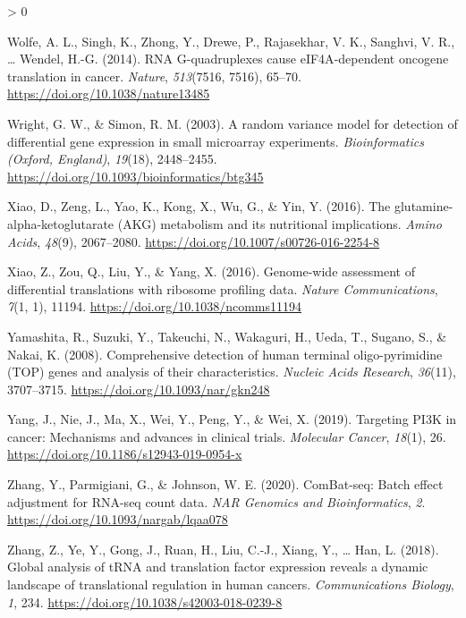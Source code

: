 \documentclass[
  12pt,
  openany]{book}
\newlength{\cslhangindent}
\newenvironment{CSLReferences}[2] %
 {%
  \setlength{\parindent}{0pt}
  \ifodd #1 \everypar{\setlength{\hangindent}{\cslhangindent}}\ignorespaces\fi
  \ifnum #2 > 0
  \setlength{\parskip}{#2\baselineskip}
  \fi
 }%
 {}
\begin{document}
\begin{CSLReferences}{1}{0}
\leavevmode\hypertarget{ref-Wolfe2014}{}%
Wolfe, A. L., Singh, K., Zhong, Y., Drewe, P., Rajasekhar, V. K., Sanghvi, V. R., \ldots{} Wendel, H.-G. (2014). {RNA G}-quadruplexes cause {eIF4A}-dependent oncogene translation in cancer. \emph{Nature}, \emph{513}(7516, 7516), 65--70. \url{https://doi.org/10.1038/nature13485}

\leavevmode\hypertarget{ref-Wright2003}{}%
Wright, G. W., \& Simon, R. M. (2003). A random variance model for detection of differential gene expression in small microarray experiments. \emph{Bioinformatics (Oxford, England)}, \emph{19}(18), 2448--2455. \url{https://doi.org/10.1093/bioinformatics/btg345}

\leavevmode\hypertarget{ref-Xiao2016}{}%
Xiao, D., Zeng, L., Yao, K., Kong, X., Wu, G., \& Yin, Y. (2016). The glutamine-alpha-ketoglutarate ({AKG}) metabolism and its nutritional implications. \emph{Amino Acids}, \emph{48}(9), 2067--2080. \url{https://doi.org/10.1007/s00726-016-2254-8}

\leavevmode\hypertarget{ref-Xiao2016a}{}%
Xiao, Z., Zou, Q., Liu, Y., \& Yang, X. (2016). Genome-wide assessment of differential translations with ribosome profiling data. \emph{Nature Communications}, \emph{7}(1, 1), 11194. \url{https://doi.org/10.1038/ncomms11194}

\leavevmode\hypertarget{ref-Yamashita2008}{}%
Yamashita, R., Suzuki, Y., Takeuchi, N., Wakaguri, H., Ueda, T., Sugano, S., \& Nakai, K. (2008). Comprehensive detection of human terminal oligo-pyrimidine ({TOP}) genes and analysis of their characteristics. \emph{Nucleic Acids Research}, \emph{36}(11), 3707--3715. \url{https://doi.org/10.1093/nar/gkn248}

\leavevmode\hypertarget{ref-Yang2019}{}%
Yang, J., Nie, J., Ma, X., Wei, Y., Peng, Y., \& Wei, X. (2019). Targeting {PI3K} in cancer: Mechanisms and advances in clinical trials. \emph{Molecular Cancer}, \emph{18}(1), 26. \url{https://doi.org/10.1186/s12943-019-0954-x}

\leavevmode\hypertarget{ref-Zhang2020}{}%
Zhang, Y., Parmigiani, G., \& Johnson, W. E. (2020). {ComBat}-seq: Batch effect adjustment for {RNA}-seq count data. \emph{NAR Genomics and Bioinformatics}, \emph{2}. \url{https://doi.org/10.1093/nargab/lqaa078}

\leavevmode\hypertarget{ref-Zhang2018}{}%
Zhang, Z., Ye, Y., Gong, J., Ruan, H., Liu, C.-J., Xiang, Y., \ldots{} Han, L. (2018). Global analysis of {tRNA} and translation factor expression reveals a dynamic landscape of translational regulation in human cancers. \emph{Communications Biology}, \emph{1}, 234. \url{https://doi.org/10.1038/s42003-018-0239-8}


\end{CSLReferences}
\end{document}
